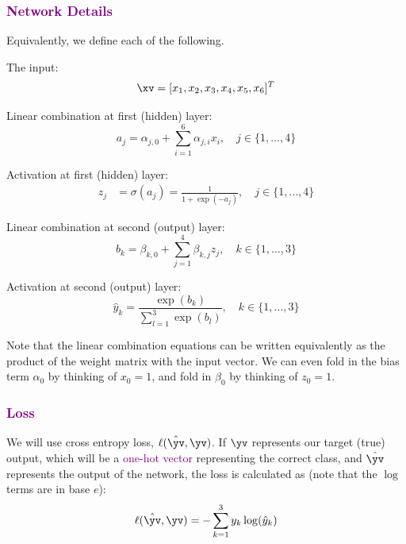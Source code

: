 \subsubsection*{\textcolor{purple}{Network Details}}
Equivalently, we define each of the following. 

The input:
\begin{align}
\xv=[x_1,x_2,x_3,x_4,x_5,x_6]^T
\end{align}

Linear combination at first (hidden) layer:
\begin{equation}
\label{eq:a_j}
a_j= \alpha_{j,0} + \sum_{i=1}^6 \alpha_{j,i}x_i,\quad j \in \{1,\ldots,4\}
\end{equation}

Activation at first (hidden) layer:
\begin{align}
\label{eq:z_j}
z_j &= \sigma(a_j) = \frac{1}{1+\exp(-a_j)},\quad  j \in \{1,\ldots,4\}
\end{align}

Linear combination at second (output) layer:
\begin{equation}
\label{eq:b_k}
b_k = \beta_{k,0} + \sum_{j=1}^4 \beta_{k,j}z_j,\quad  k \in \{1,\ldots,3\}
\end{equation}

Activation at second (output) layer:
\begin{equation}
\hat{y}_k = \frac{\exp(b_k)}{\sum\limits_{l=1}^3 \exp(b_l)},\quad  k \in \{1,\ldots,3\}
\end{equation}

Note that the linear combination equations can be written equivalently as the product of the weight matrix with the input vector. We can even fold in the bias term $\alpha_0$ by thinking of $x_0 = 1$, and fold in $\beta_0$ by thinking of $z_0 = 1$.

\subsubsection*{\textcolor{purple}{Loss}}

We will use cross entropy loss, $\ell(\hat{\yv},\yv)$. If $\yv$ represents our target (true) output, which will be a \textcolor{purple}{one-hot vector} representing the correct class, and $\hat{\yv}$ represents the output of the network, the loss is calculated as (note that the $\log$ terms are in base $e$):
\begin{equation}
\label{eq:cross_entropy_loss}
   \ell(\hat{\yv},\yv) = - \sum_{k=1}^3 y_k \log(\hat{y}_k)
\end{equation}

